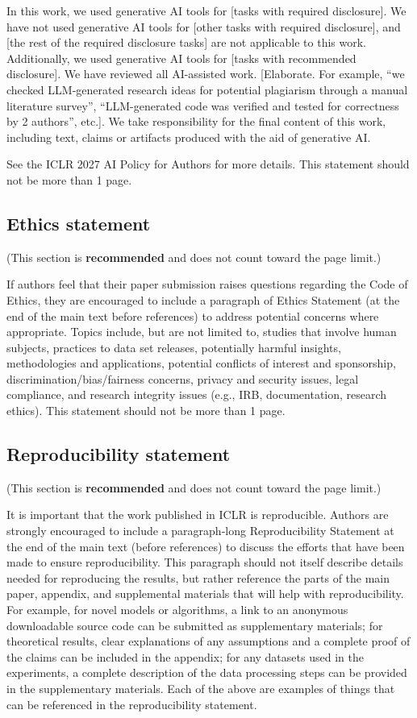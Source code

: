 \documentclass{article} %
\begin{document}
In this work, we used generative AI tools for [tasks with required disclosure].
We have not used generative AI tools for [other tasks with required disclosure],
and [the rest of the required disclosure tasks] are not applicable to this work.
Additionally, we used generative AI tools for [tasks with recommended
disclosure]. We have reviewed all AI-assisted work. [Elaborate. For example, “we
checked LLM-generated research ideas for potential plagiarism through a manual
literature survey”, “LLM-generated code was verified and tested for correctness
by 2 authors”, etc.]. We take responsibility for the final content of this work,
including text, claims or artifacts produced with the aid of generative AI.

See the ICLR 2027 AI Policy for Authors for more details. This statement should
not be more than 1 page.

\subsection*{Ethics statement}

(This section is \textbf{recommended} and does not count toward the page limit.)

If authors feel that their paper submission raises questions regarding the Code
of Ethics, they are encouraged to include a paragraph of Ethics Statement (at
the end of the main text before references) to address potential concerns where
appropriate. Topics include, but are not limited to, studies that involve human
subjects, practices to data set releases, potentially harmful insights,
methodologies and applications, potential conflicts of interest and sponsorship,
discrimination/bias/fairness concerns, privacy and security issues, legal
compliance, and research integrity issues (e.g., IRB, documentation, research
ethics). This statement should not be more than 1 page.

\subsection*{Reproducibility statement}

(This section is \textbf{recommended} and does not count toward the page limit.)

It is important that the work published in ICLR is reproducible. Authors are
strongly encouraged to include a paragraph-long Reproducibility Statement at the
end of the main text (before references) to discuss the efforts that have been
made to ensure reproducibility. This paragraph should not itself describe
details needed for reproducing the results, but rather reference the parts of
the main paper, appendix, and supplemental materials that will help with
reproducibility. For example, for novel models or algorithms, a link to an
anonymous downloadable source code can be submitted as supplementary materials;
for theoretical results, clear explanations of any assumptions and a complete
proof of the claims can be included in the appendix; for any datasets used in
the experiments, a complete description of the data processing steps can be
provided in the supplementary materials. Each of the above are examples of
things that can be referenced in the reproducibility statement.
\end{document}
